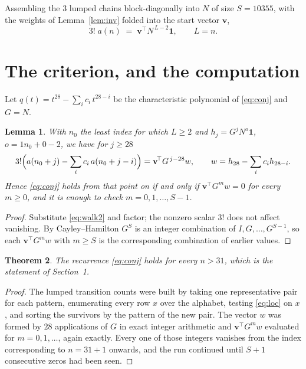 \documentclass[11pt,a4paper]{article}
\theoremstyle{plain}
\newtheorem{theorem}{Theorem}
\newtheorem{lemma}[theorem]{Lemma}
\theoremstyle{definition}
\begin{document}
Assembling the $3$ lumped chains block-diagonally into $N$ of size $S=10355$, with the
weights of Lemma~\ref{lem:inv} folded into the start vector $\mathbf{v}$,
\begin{equation}\label{eq:walk2}
3!\;a(n)\;=\;\mathbf{v}^{\!\top}N^{\,L-2}\mathbf{1},\qquad L=n .
\end{equation}

\section{The criterion, and the computation}

Let $q(t)=t^{28}-\sum_i c_i\,t^{28-i}$ be the characteristic polynomial of
\eqref{eq:conj} and $G=N$.

\begin{lemma}\label{lem:crit}
With $n_0$ the least index for which $L\ge2$ and $h_j=G^{j}N^{o}\mathbf{1}$,
$o=1n_0+0-2$, we have for $j\ge28$
\[
3!\Bigl(a(n_0+j)-\sum_i c_i\,a(n_0+j-i)\Bigr)
=\mathbf{v}^{\!\top}G^{\,j-28}w,\qquad
w=h_{28}-\sum_i c_i h_{28-i} .
\]
Hence \eqref{eq:conj} holds from that point on if and only if
$\mathbf{v}^{\!\top}G^{m}w=0$ for every $m\ge0$, and it is enough to check
$m=0,1,\dots,S-1$.
\end{lemma}

\begin{proof}
Substitute \eqref{eq:walk2} and factor; the nonzero scalar $3!$ does not affect
vanishing. By Cayley--Hamilton $G^{S}$ is an integer combination of $I,G,\dots,G^{S-1}$,
so each $\mathbf{v}^{\!\top}G^{m}w$ with $m\ge S$ is the corresponding combination of
earlier values.
\end{proof}

\begin{theorem}
The recurrence \eqref{eq:conj} holds for every $n>31$, which is the statement of
Section~1.
\end{theorem}

\begin{proof}
The lumped transition counts were built by taking one representative pair for each pattern,
enumerating every row $x$ over the alphabet, testing \eqref{eq:loc} on $x$, and sorting
the survivors by the pattern of the new pair. The vector $w$ was formed by $28$
applications of $G$ in exact integer arithmetic and $\mathbf{v}^{\!\top}G^{m}w$
evaluated for $m=0,1,\dots$, again exactly. Every one of those integers vanishes from the
index corresponding to $n=31+1$ onwards, and the run continued until $S+1$ consecutive
zeros had been seen.
\end{proof}
\end{document}
